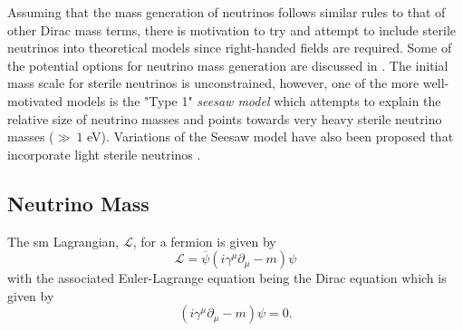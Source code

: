 Assuming that the mass generation of neutrinos follows similar rules to that of other Dirac mass terms, there is motivation to try and attempt to include sterile neutrinos into theoretical models since right-handed fields are required. Some of the potential options for neutrino mass generation are discussed in . The initial mass scale for sterile neutrinos is unconstrained, however, one of the more well-motivated models is the "Type 1" \textit{seesaw model} which attempts to explain the relative size of neutrino masses and points towards very heavy sterile neutrino masses ($\gg ~1$ eV). Variations of the Seesaw model have also been proposed that incorporate light sterile neutrinos \cite{White_Paper}.

\subsection{Neutrino Mass}\label{subsec:Neutrino Mass}
The \gls{sm} Lagrangian, $\mathcal{L}$, for a fermion is given by
\begin{equation}\label{eqn:SM Lagrangian}
    \mathcal{L} = \overline{\psi}(i\gamma^{\mu} \partial_{\mu} - m)\psi
\end{equation}
with the associated Euler-Lagrange equation being the Dirac equation which is given by \cite{Fundamentals_of_Neutrino_Physics_and_Astrophysics}
\begin{equation}
    (i\gamma^\mu\partial_\mu - m)\psi = 0.
\end{equation}
